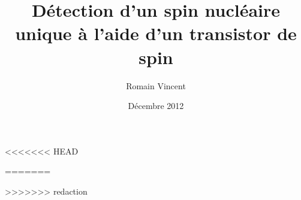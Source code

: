 \documentclass[a4paper,12pt]{book}
\begin{document}
\author{Romain Vincent} 
\title{\Huge Détection d'un spin nucléaire unique à l'aide d'un transistor de spin} 
\date{Décembre 2012}
\maketitle
\thispagestyle{empty}

\frontmatter 
\sloppy %
\tableofcontents
<<<<<<< HEAD


=======

\mainmatter 

%

%



%
%
%
>>>>>>> redaction



\end{document}
